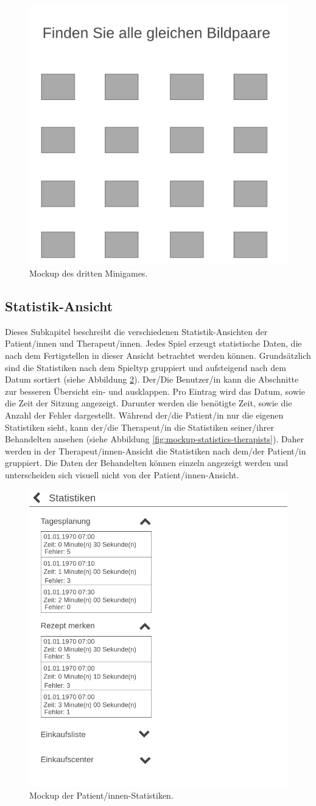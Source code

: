 \begin{figure}[H]
    \centering
	\includegraphics[width=0.6\linewidth]{figures/development/minigame/minigame-3.png}
	\caption{Mockup des dritten Minigames.}
	\label{fig:minigame-3}
\end{figure}

\subsection{Statistik-Ansicht}
Dieses Subkapitel beschreibt die verschiedenen Statistik-Ansichten der Patient/innen und Therapeut/innen. Jedes Spiel erzeugt statistische Daten, die nach dem Fertigstellen in dieser Ansicht betrachtet werden können. Grundsätzlich sind die Statistiken nach dem Spieltyp gruppiert und aufsteigend nach dem Datum sortiert (siehe Abbildung \ref{fig:mockup-statistics}). Der/Die Benutzer/in kann die Abschnitte zur besseren Übersicht ein- und ausklappen. Pro Eintrag wird das Datum, sowie die Zeit der Sitzung angezeigt. Darunter werden die benötigte Zeit, sowie die Anzahl der Fehler dargestellt. Während der/die Patient/in nur die eigenen Statistiken sieht, kann der/die Therapeut/in die Statistiken seiner/ihrer Behandelten ansehen (siehe Abbildung \ref{fig:mockup-statistics-therapists}). Daher werden in der Therapeut/innen-Ansicht die Statistiken nach dem/der Patient/in gruppiert. Die Daten der Behandelten können einzeln angezeigt werden und unterscheiden sich visuell nicht von der Patient/innen-Ansicht.

\begin{figure}[H]
    \centering
	\includegraphics[width=0.5\linewidth]{figures/development/mockup/statistics.png}
	\caption{Mockup der Patient/innen-Statistiken.}
	\label{fig:mockup-statistics}
\end{figure}

